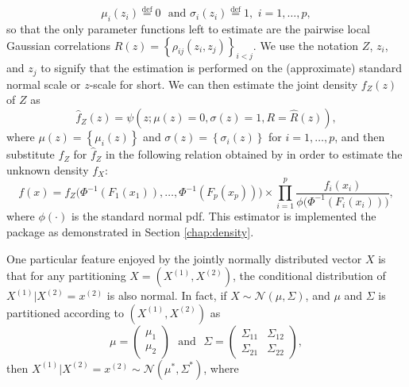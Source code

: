 \begin{equation}
\mu_i\left(z_i\right) \stackrel{\textrm{def}}{=} 0 \,\, \textrm{ and } \sigma_i\left(z_i\right) \stackrel{\textrm{def}}{=} 1, \,\, i = 1,\ldots,p,
\label{eq:simp}
\end{equation}
so that the only parameter functions left to estimate are the pairwise local Gaussian correlations $R\left(z\right) = \left\{\rho_{ij}\left(z_i, z_j\right)\right\}_{i<j}$. We use the notation $Z$, $z_i$, and $z_j$ to signify that the estimation is performed on the (approximate) standard normal scale or $z$-scale for short. We can then estimate the joint density $f_Z\left(z\right)$ of $Z$ as
\begin{equation}
\widehat f_Z\left(z\right) = \psi\left(z; \mu\left(z\right) = 0, \sigma\left(z\right) = 1, R = \widehat R\left(z\right)\right),
\label{eq:transformed-density}
\end{equation}
where $\mu\left(z\right) = \left\{\mu_i\left(z\right)\right\}$ and $\sigma\left(z\right) = \left\{\sigma_i\left(z\right)\right\}$ for $i=1,\ldots,p$, and then substitute $f_Z$ for $\widehat f_Z$ in the following relation obtained by \citet{otne:tjos:2017} in order to estimate the unknown density $f_X$:
\begin{equation}
f\left(x\right) = f_{Z}\big(\Phi^{-1}\left(F_1\left(x_1\right)\right), \ldots, \Phi^{-1}\left(F_p\left(x_p\right)\right)\big) \times \prod_{i=1}^p \frac{f_i\left(x_i\right)}{\phi\big(\Phi^{-1}\left(F_i\left(x_i\right)\right)\big)},
\label{eq:backtrans}
\end{equation}
where $\phi\left(\cdot\right)$ is the standard normal pdf. This estimator is implemented the  package as demonstrated in Section \ref{chap:density}.

One particular feature enjoyed by the jointly normally distributed vector $X$ is that for any partitioning $X = \left(X^{\left(1\right)}, X^{\left(2\right)}\right)$, the conditional distribution of $X^{\left(1\right)}|X^{\left(2\right)} = x^{\left(2\right)}$ is also normal. In fact, if $X \sim \mathcal{N}\left(\mu,\Sigma\right)$, and $\mu$ and $\Sigma$ is partitioned according to $\left(X^{\left(1\right)}, X^{\left(2\right)}\right)$ as
$$\mu = \begin{pmatrix} \mu_1 \\\mu_2 \end{pmatrix} \,\, \textrm{ and } \,\, \Sigma = \begin{pmatrix} \Sigma_{11} & \Sigma_{12} \\ \Sigma_{21} & \Sigma_{22} \end{pmatrix},$$
then $X^{\left(1\right)}|X^{\left(2\right)} = x^{\left(2\right)} \sim \mathcal{N}\left(\mu^*, \Sigma^*\right)$, where


